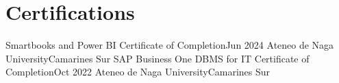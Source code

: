 \section{Certifications}

\resumeSubHeadingListStart
    \resumeSubheading
    {Smartbooks and Power BI Certificate of Completion}{Jun 2024}
    {Ateneo de Naga University}{Camarines Sur}
    \resumeSubheading
    {SAP Business One DBMS for IT Certificate of Completion}{Oct 2022}
    {Ateneo de Naga University}{Camarines Sur}
\resumeSubHeadingListEnd